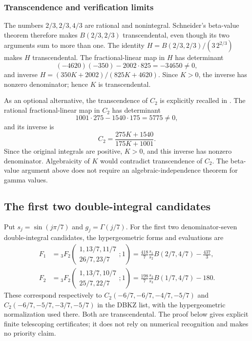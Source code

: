\documentclass[11pt,a4paper]{article}
\theoremstyle{definition}
\theoremstyle{remark}
\numberwithin{equation}{section}
\begin{document}
\subsubsection*{Transcendence and verification limits}
The numbers $2/3,2/3,4/3$ are rational and nonintegral.  Schneider's
beta-value theorem \cite{extra8-schneider} therefore makes $B(2/3,2/3)$
transcendental, even though its two arguments sum to more than one.
The identity $H=B(2/3,2/3)/(3\,2^{2/3})$ makes $H$ transcendental.
The fractional-linear map in $H$ has determinant
\[
 (-4620)(-350)-2002\cdot825=-34650\ne0,
\]
and inverse $H=(350K+2002)/(825K+4620)$.  Since $K>0$, the inverse
has nonzero denominator; hence $K$ is transcendental.

As an optional alternative, the transcendence of $C_2$ is explicitly
recalled in \cite[p.~2]{extra8-zudilin}.  The rational fractional-linear map
in $C_2$ has determinant
\[
 1001\cdot275-1540\cdot175=5775\ne0,
\]
and its inverse is
\[
 C_2=\frac{275K+1540}{175K+1001}.
\]
Since the original integrals are positive, $K>0$, and this inverse has
nonzero denominator.  Algebraicity of $K$ would contradict transcendence
of $C_2$.  The beta-value argument above does not require an
algebraic-independence theorem for gamma values.

\subsection{The first two double-integral candidates}
\label{extra8-sec:double12}

Put $s_j=\sin(j\pi/7)$ and $g_j=\Gamma(j/7)$.  For the first two
denominator-seven double-integral candidates, the hypergeometric forms
and evaluations are
\begin{align}
 F_1&={}_3F_2\left(\begin{matrix}1,13/7,11/7\\26/7,23/7\end{matrix};1\right)
 =\frac{418}{7}\frac{s_1}{s_2}B(2/7,4/7)-\frac{437}{3},
 \label{extra8-eq:double1-final}\\
 F_2&={}_3F_2\left(\begin{matrix}1,13/7,10/7\\25/7,22/7\end{matrix};1\right)
 =\frac{198}{7}\frac{s_2}{s_3}B(1/7,4/7)-180.
 \label{extra8-eq:double2-final}
\end{align}
These correspond respectively to
$C_2(-6/7,-6/7,-4/7,-5/7)$ and
$C_2(-6/7,-5/7,-3/7,-5/7)$ in the DBKZ list, with the
hypergeometric normalization used there.  Both are transcendental.
The proof below gives explicit finite telescoping certificates; it
does not rely on numerical recognition and makes no priority claim.
\end{document}
